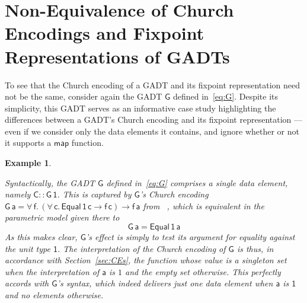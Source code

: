 \documentclass[submission,copyright,creativecommons]{eptcs}
\newtheorem{example}[thm]{Example}
\begin{document}
\section{Non-Equivalence of Church Encodings and 
    Fixpoint Representations of GADTs}\label{sec:non-equiv}

To see that the Church encoding of a GADT and its fixpoint
representation need not be the same, consider again the GADT
$\mathsf{G}$ defined in~\eqref{eq:G}. Despite its simplicity, this
GADT serves as an informative case study highlighting the differences
between a GADT's Church encoding and its fixpoint representation ---
even if we consider only the data elements it contains, and ignore
whether or not it supports a $\mathsf{map}$ function.

\begin{example}\label{ex:g1}

Syntactically, the GADT $\mathsf{G}$ defined in~\eqref{eq:G} comprises
a single data element, namely $\mathsf{C :: G \, 1}$. This is captured
by $\mathsf{G}$'s Church encoding $\mathsf{G\,a} = \mathsf{\forall\,f.
  \, (\forall\,c.\, Equal\,1\,c \to f\,c) \to f\,a}$ from
~\cite{atk12}, which is equivalent in the parametric model given there
to
\[\mathsf{G\, a = Equal\,1\,a}\]
As this makes clear,
$\mathsf{G}$'s
effect is simply to test its argument for equality against the unit
type $\mathsf{1}$. The interpretation of the Church encoding of
$\mathsf{G}$ is thus, in accordance with Section~\ref{sec:CEs}, the
function whose value is a singleton set when the interpretation of
$\mathsf{a}$ is $1$ and the empty set otherwise. This perfectly
accords with $\mathsf{G}$'s syntax, which indeed delivers just one
data element when $\mathsf{a}$ is $\mathsf{1}$ and no elements
otherwise.


\end{example}
\end{document}
